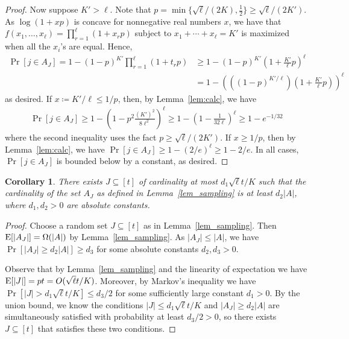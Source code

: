 \documentclass[11pt]{article}
\newtheorem{corollary}[theorem]{Corollary}
\newcommand{\ex}{{\rm{E}}}
\begin{document}
\begin{proof}
   Now suppose $K' > \ell$.
   Note that $p = \min\{\sqrt{\ell}/(2K),\frac{1}{2}\} \ge \sqrt{\ell}/(2K')$.
   As $\log (1+xp)$ is concave for nonnegative real numbers $x$, we have that $f(x_1,\dots,x_\ell)=\prod_{r=1}^{\ell} (1+x_rp)$ subject to $x_1+\cdots+x_\ell=K'$ is maximized when all the $x_i$'s are equal.
   Hence,
   \begin{align}
    \Pr[j\in A_J]
    = 1 - (1-p)^{K'}\prod_{r=1}^{\ell} (1+t_rp)
    &\ge 1 - (1-p)^{K'}\left( 1 + \frac{K'}{\ell}p \right)^{\ell}  \nonumber\\
    &= 1 - \left(\left((1-p)^{K'/\ell}\right)\left( 1 + \frac{K'}{\ell}p \right)\right)^{\ell}
   \end{align}
   as desired.
   If $x\coloneqq K'/\ell\le 1/p$, then, by Lemma~\ref{lem:calc}, we have
   \begin{align}
    \Pr[j\in A_J]
    \ge 1 - \left(1-p^2\frac{(K')^2}{8\ell^2}\right)^\ell
    \ge 1-\left( 1-\frac{1}{32\ell} \right)^{\ell} \ge 1 - e^{-1/32}
   \end{align}
   where the second inequality uses the fact $p\ge \sqrt{\ell}/(2K')$.
   If $x\ge 1/p$, then by Lemma~\ref{lem:calc}, we have $\Pr[j\in A_J] \ge 1-(2/e)^\ell \ge 1-2/e$.
   In all cases,  $\Pr[j\in A_J]$ is bounded below by a constant, as desired.
 \end{proof}


\begin{corollary}\label{cor_existJ}
There exists $J\subseteq [t]$ of cardinality at most $d_1 \sqrt{\ell}t/K$ such that the cardinality of the set $A_J$ as defined in Lemma~\ref{lem_sampling} is at least $d_2 |A|$, where $d_1,d_2>0$ are absolute constants.
\end{corollary}

\begin{proof}
Choose a random set $J\subseteq [t]$ as in  Lemma~\ref{lem_sampling}. Then $\ex[|A_J|]=\Omega(|A|)$ by Lemma~\ref{lem_sampling}.
As $|A_J|\leq |A|$, we have $\Pr[|A_J|\geq d_2|A|]\geq d_3$ for some absolute constants $d_2,d_3>0$.

Observe that by Lemma~\ref{lem_sampling} and the linearity of expectation we have $\ex[|J|]=pt=O(\sqrt{\ell}t/K)$. Moreover, by Markov's inequality we have $\Pr[|J|>d_1 \sqrt{\ell}t/K]\leq d_3/2$ for some sufficiently large constant $d_1>0$. By the union bound, we know the conditions $|J|\leq d_1 \sqrt{\ell}t/K$ and $|A_J|\geq d_2|A|$ are simultaneously satisfied with probability at least $d_3/2>0$, so there exists $J\subseteq [t]$ that satisfies these two conditions.
\end{proof}
\end{document}

